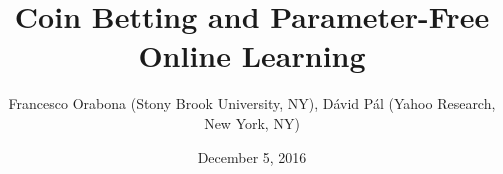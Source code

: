 \documentclass[30pt,landscape]{sciposter}
\begin{document}
\renewcommand{\thefootnote}{\fnsymbol{footnote}}
\renewcommand{\footlogo}{Typeset by pdf\LaTeX}
\renewcommand{\algorithmicrequire}{\textbf{Input:}}

\title{Coin Betting and Parameter-Free Online Learning}
\author{Francesco Orabona (Stony Brook University, NY), D\'avid P\'al (Yahoo Research, New York, NY)}

\date{December 5, 2016}


\maketitle
\end{document}
